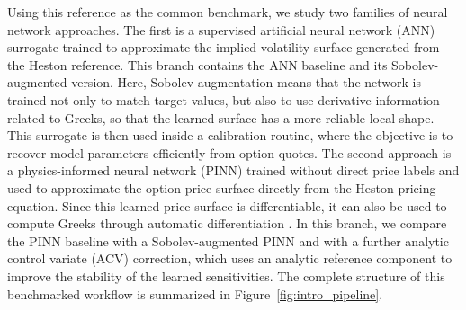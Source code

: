 Using this reference as the common benchmark, we study two families of neural network approaches. 
The first is a supervised artificial neural network (ANN) surrogate trained to approximate the implied-volatility surface generated from the Heston reference. 
This branch contains the ANN baseline and its Sobolev-augmented version.
Here, Sobolev augmentation means that the network is trained not only to match target values, but also to use derivative information related to Greeks, so that the learned surface has a more reliable local shape.
This surrogate is then used inside a calibration routine, where the objective is to recover model parameters efficiently from option quotes. 
The second approach is a physics-informed neural network (PINN) trained without direct price labels and used to approximate the option price surface directly from the Heston pricing equation. 
Since this learned price surface is differentiable, it can also be used to compute Greeks through automatic differentiation \cite{baydin2018autodiff}. 
In this branch, we compare the PINN baseline with a Sobolev-augmented PINN and with a further analytic control variate (ACV) correction, which uses an analytic reference component to improve the stability of the learned sensitivities.
The complete structure of this benchmarked workflow is summarized in Figure~\ref{fig:intro_pipeline}.


